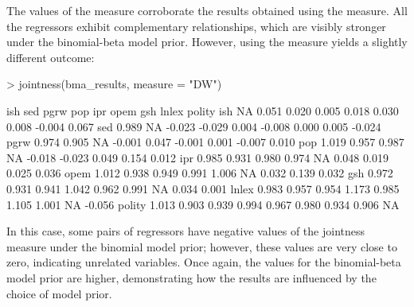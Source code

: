 \documentclass[a4paper]{article}
\begin{document}
The values of the \citet{Ley+2007} measure corroborate the results obtained using the \citet{Hofmarcher+2018} measure. All the regressors exhibit complementary relationships, which are visibly stronger under the binomial-beta model prior. However, using the \citet{Doppelhofer+2009} measure yields a slightly different outcome:
\begin{Schunk}
\begin{Sinput}
> jointness(bma_results, measure = "DW")
\end{Sinput}
\begin{Soutput}
         ish   sed   pgrw    pop    ipr   opem   gsh  lnlex polity
ish       NA 0.051  0.020  0.005  0.018  0.030 0.008 -0.004  0.067
sed    0.989    NA -0.023 -0.029  0.004 -0.008 0.000  0.005 -0.024
pgrw   0.974 0.905     NA -0.001  0.047 -0.001 0.001 -0.007  0.010
pop    1.019 0.957  0.987     NA -0.018 -0.023 0.049  0.154  0.012
ipr    0.985 0.931  0.980  0.974     NA  0.048 0.019  0.025  0.036
opem   1.012 0.938  0.949  0.991  1.006     NA 0.032  0.139  0.032
gsh    0.972 0.931  0.941  1.042  0.962  0.991    NA  0.034  0.001
lnlex  0.983 0.957  0.954  1.173  0.985  1.105 1.001     NA -0.056
polity 1.013 0.903  0.939  0.994  0.967  0.980 0.934  0.906     NA
\end{Soutput}
\end{Schunk}
In this case, some pairs of regressors have negative values of the jointness measure under the binomial model prior; however, these values are very close to zero, indicating unrelated variables. Once again, the values for the binomial-beta model prior are higher, demonstrating how the results are influenced by the choice of model prior.
\end{document}
